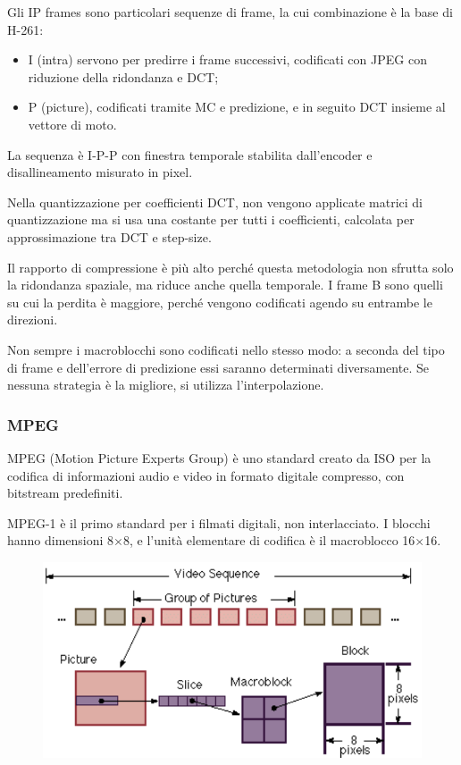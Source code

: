 Gli IP frames sono particolari sequenze di frame, la cui combinazione è la base di H-261:
\begin{itemize}
	\item I (intra) servono per predirre i frame successivi, codificati con JPEG con riduzione della ridondanza e DCT;
	\item P (picture), codificati tramite MC e predizione, e in seguito DCT insieme al vettore di moto.
\end{itemize}
La sequenza è I-P-P con finestra temporale stabilita dall'encoder e disallineamento misurato in pixel.

Nella quantizzazione per coefficienti DCT, non vengono applicate matrici di quantizzazione ma si usa una costante per tutti i coefficienti, calcolata per approssimazione tra DCT e step-size.

Il rapporto di compressione è più alto perché questa metodologia non sfrutta solo la ridondanza spaziale, ma riduce anche quella temporale. I frame B sono quelli su cui la perdita è maggiore, perché vengono codificati agendo su entrambe le direzioni.

Non sempre i macroblocchi sono codificati nello stesso modo: a seconda del tipo di frame e dell'errore di predizione essi saranno determinati diversamente. Se nessuna strategia è la migliore, si utilizza l'interpolazione.

\subsubsection{MPEG}
MPEG (Motion Picture Experts Group) è uno standard creato da ISO per la codifica di informazioni audio e video in formato digitale compresso, con bitstream predefiniti. 

MPEG-1 è il primo standard per i filmati digitali, non interlacciato. I blocchi hanno dimensioni 8$\times$8, e l'unità elementare di codifica è il macroblocco 16$\times$16.

\begin{figure}[h]
	\centering
	\includegraphics[scale=0.4]{Lezioni/Immagini/mpeg-gerarchica}
\end{figure}

